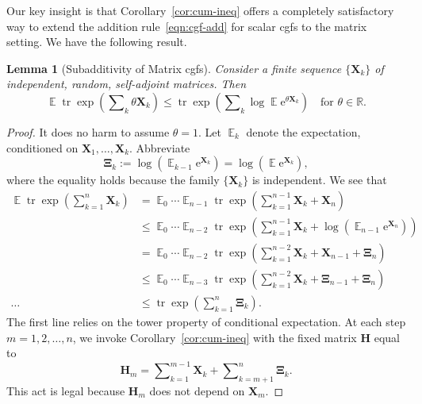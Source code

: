 \documentclass[11pt,letterpaper,twoside,reqno,draft]{amsart}
\newtheorem{lemma}[thm]{Lemma}
\theoremstyle{remark}
\numberwithin{equation}{section}
\numberwithin{thm}{section}
\begin{document}
Our key insight is that Corollary~\ref{cor:cum-ineq} offers a completely satisfactory way to extend the addition rule~\eqref{eqn:cgf-add} for scalar cgfs to the matrix setting.  We have the following result.

\begin{lemma}[Subadditivity of Matrix cgfs] \label{lem:cgf-indep}
Consider a finite sequence $\{ {\bm{{X}}}_k \}$ of independent, random, self-adjoint matrices.  Then
$$
{\operatorname{\mathbb{E}}} {\operatorname{tr}} \exp\left( \sum\nolimits_k \theta {\bm{{X}}}_k \right)
	\leq {\operatorname{tr}} \exp\left( \sum\nolimits_k \log {\operatorname{\mathbb{E}}} {\mathrm{e}}^{\theta {\bm{{X}}}_k} \right)
	\quad\text{for $\theta \in \mathbb{R}$.}
$$
\end{lemma}

\begin{proof}
It does no harm to assume $\theta = 1$.
Let ${\operatorname{\mathbb{E}}}_k$ denote the expectation, conditioned on ${\bm{{X}}}_1, \dots, {\bm{{X}}}_{k}$.  Abbreviate
\begin{equation*}\label{eqn:xi-k}
{\bm{{\Xi}}}_k := \log( {\operatorname{\mathbb{E}}}_{k-1} {\mathrm{e}}^{{\bm{{X}}}_k} )
	= \log( {\operatorname{\mathbb{E}}} {\mathrm{e}}^{{\bm{{X}}}_k} ),
\end{equation*}
where the equality holds because the family $\{{\bm{{X}}}_k\}$ is independent.   We see that
\begin{align*}
{\operatorname{\mathbb{E}}} {\operatorname{tr}} \exp\left( \sum\nolimits_{k=1}^n {\bm{{X}}}_k \right)
	&= {\operatorname{\mathbb{E}}}_0 \cdots {\operatorname{\mathbb{E}}}_{n-1}
		{\operatorname{tr}} \exp\left( \sum\nolimits_{k=1}^{n-1} {\bm{{X}}}_k
		+ {\bm{{X}}}_n \right)  \\
	&\leq {\operatorname{\mathbb{E}}}_{0} \cdots {\operatorname{\mathbb{E}}}_{n-2}
		{\operatorname{tr}} \exp\left( \sum\nolimits_{k=1}^{n-1} {\bm{{X}}}_k
		+ \log({\operatorname{\mathbb{E}}}_{n-1} {\mathrm{e}}^{ {\bm{{X}}}_n} ) \right) \\
	&= {\operatorname{\mathbb{E}}}_{0} \cdots {\operatorname{\mathbb{E}}}_{n-2}
		{\operatorname{tr}} \exp\left( \sum\nolimits_{k=1}^{n-2} {\bm{{X}}}_k
		+ {\bm{{X}}}_{n-1} + {\bm{{\Xi}}}_n \right) \\
	&\leq {\operatorname{\mathbb{E}}}_{0} \cdots {\operatorname{\mathbb{E}}}_{n-3}
		{\operatorname{tr}} \exp\left( \sum\nolimits_{k=1}^{n-2} {\bm{{X}}}_k
		+ {\bm{{\Xi}}}_{n-1} + {\bm{{\Xi}}}_{n} \right) \\
\dots\quad
	&\leq {\operatorname{tr}} \exp\left( \sum\nolimits_{k=1}^{n} {\bm{{\Xi}}}_k \right).
\end{align*}
The first line relies on the tower property of conditional expectation.  At each step $m = 1, 2, \dots, n$, we invoke Corollary~\ref{cor:cum-ineq} with the fixed matrix ${\bm{{H}}}$ equal to
$$
{\bm{{H}}}_m = \sum\nolimits_{k=1}^{m-1} {\bm{{X}}}_k +
	\sum\nolimits_{k=m+1}^n {\bm{{\Xi}}}_k.
$$
This act is legal because ${\bm{{H}}}_m$ does not depend on ${\bm{{X}}}_m$.
\end{proof}
\end{document}
